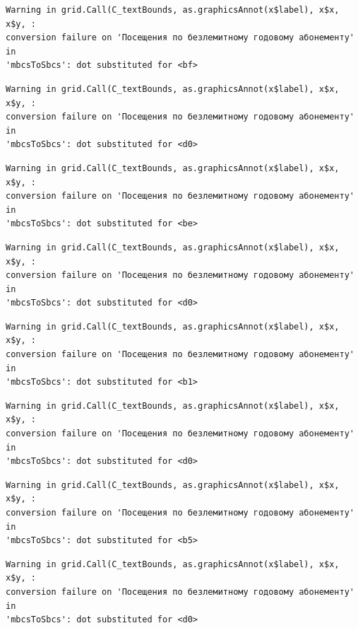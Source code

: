\documentclass[
  letterpaper,
  DIV=11,
  numbers=noendperiod]{scrartcl}
\begin{document}
\begin{verbatim}
Warning in grid.Call(C_textBounds, as.graphicsAnnot(x$label), x$x, x$y, :
conversion failure on 'Посещения по безлемитному годовому абонементу' in
'mbcsToSbcs': dot substituted for <bf>
\end{verbatim}

\begin{verbatim}
Warning in grid.Call(C_textBounds, as.graphicsAnnot(x$label), x$x, x$y, :
conversion failure on 'Посещения по безлемитному годовому абонементу' in
'mbcsToSbcs': dot substituted for <d0>
\end{verbatim}

\begin{verbatim}
Warning in grid.Call(C_textBounds, as.graphicsAnnot(x$label), x$x, x$y, :
conversion failure on 'Посещения по безлемитному годовому абонементу' in
'mbcsToSbcs': dot substituted for <be>
\end{verbatim}

\begin{verbatim}
Warning in grid.Call(C_textBounds, as.graphicsAnnot(x$label), x$x, x$y, :
conversion failure on 'Посещения по безлемитному годовому абонементу' in
'mbcsToSbcs': dot substituted for <d0>
\end{verbatim}

\begin{verbatim}
Warning in grid.Call(C_textBounds, as.graphicsAnnot(x$label), x$x, x$y, :
conversion failure on 'Посещения по безлемитному годовому абонементу' in
'mbcsToSbcs': dot substituted for <b1>
\end{verbatim}

\begin{verbatim}
Warning in grid.Call(C_textBounds, as.graphicsAnnot(x$label), x$x, x$y, :
conversion failure on 'Посещения по безлемитному годовому абонементу' in
'mbcsToSbcs': dot substituted for <d0>
\end{verbatim}

\begin{verbatim}
Warning in grid.Call(C_textBounds, as.graphicsAnnot(x$label), x$x, x$y, :
conversion failure on 'Посещения по безлемитному годовому абонементу' in
'mbcsToSbcs': dot substituted for <b5>
\end{verbatim}

\begin{verbatim}
Warning in grid.Call(C_textBounds, as.graphicsAnnot(x$label), x$x, x$y, :
conversion failure on 'Посещения по безлемитному годовому абонементу' in
'mbcsToSbcs': dot substituted for <d0>
\end{verbatim}
\end{document}

